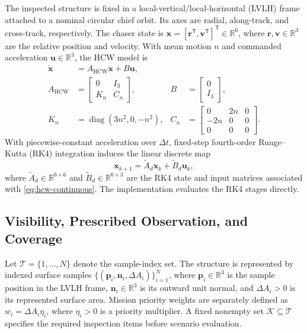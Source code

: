 \documentclass{IEEEtaes}
\newcommand{\R}{\mathbb{R}}
\newcommand{\dt}{\Delta t}
\begin{document}
The inspected structure is fixed in a local-vertical/local-horizontal (LVLH) frame attached to a nominal circular chief orbit. Its axes are radial, along-track, and cross-track, respectively. The chaser state is $\mathbf{x}=[\mathbf{r}^{\mathsf T},\mathbf{v}^{\mathsf T}]^{\mathsf T}\in\R^6$, where $\mathbf r,\mathbf v\in\R^3$ are the relative position and velocity. With mean motion $n$ and commanded acceleration $\mathbf u\in\R^3$, the HCW model is
\begin{equation}
  \begin{aligned}
  \dot{\mathbf{x}}&=A_{\mathrm{HCW}}\mathbf{x}+B\mathbf{u},\\
  A_{\mathrm{HCW}}&=\begin{bmatrix}0&I_3\\K_n&C_n\end{bmatrix},
  &B&=\begin{bmatrix}0\\I_3\end{bmatrix},\\
  K_n&=\operatorname{diag}(3n^2,0,-n^2),
  &C_n&=\begin{bmatrix}0&2n&0\\-2n&0&0\\0&0&0\end{bmatrix}.
  \end{aligned}
  \label{eq:hcw-continuous}
\end{equation}
With piecewise-constant acceleration over $\dt$, fixed-step fourth-order Runge--Kutta (RK4) integration induces the linear discrete map
\begin{equation}
  \mathbf{x}_{k+1}=\widetilde A_d\mathbf{x}_k+\widetilde B_d\mathbf{u}_k,
  \label{eq:hcw-discrete}
\end{equation}
where $\widetilde A_d\in\mathbb R^{6\times6}$ and $\widetilde B_d\in\mathbb R^{6\times3}$ are the RK4 state and input matrices associated with \eqref{eq:hcw-continuous}. The implementation evaluates the RK4 stages directly.

\subsection{Visibility, Prescribed Observation, and Coverage}

Let $\mathcal T=\{1,\ldots,N\}$ denote the sample-index set. The structure is represented by indexed surface samples $\{(\mathbf p_i,\mathbf n_i,\Delta A_i)\}_{i=1}^{N}$, where $\mathbf p_i\in\mathbb R^3$ is the sample position in the LVLH frame, $\mathbf n_i\in\mathbb R^3$ is its outward unit normal, and $\Delta A_i>0$ is its represented surface area. Mission priority weights are separately defined as $w_i=\Delta A_i\eta_i$, where $\eta_i>0$ is a priority multiplier. A fixed nonempty set $\mathcal K\subseteq\mathcal T$ specifies the required inspection items before scenario evaluation.
\end{document}
